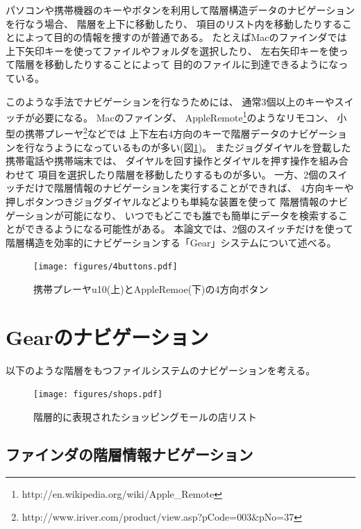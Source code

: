 \documentclass[twoside]{wiss}
\def\GEAR{\textsf{Gear}}
\begin{document}
パソコンや携帯機器のキーやボタンを利用して階層構造データのナビゲーションを行なう場合、
階層を上下に移動したり、
項目のリスト内を移動したりすることによって目的の情報を捜すのが普通である。
たとえばMacのファインダでは
上下矢印キーを使ってファイルやフォルダを選択したり、
左右矢印キーを使って階層を移動したりすることによって
目的のファイルに到達できるようになっている。

このような手法でナビゲーションを行なうためには、
通常3個以上のキーやスイッチが必要になる。
%
Macのファインダ、
AppleRemote\footnote{
  \textsf{http://en.wikipedia.org/wiki/Apple\_Remote}
}のようなリモコン、
小型の携帯プレーヤ\footnote{
  \textsf{http://www.iriver.com/product/view.asp?pCode=003\&pNo=37}
}などでは
上下左右4方向のキーで階層データのナビゲーションを行なうようになっているものが多い(図\ref{4buttons})。
またジョグダイヤルを登載した携帯電話や携帯端末では、
ダイヤルを回す操作とダイヤルを押す操作を組み合わせて
項目を選択したり階層を移動したりするものが多い。
%
一方、2個のスイッチだけで階層情報のナビゲーションを実行することができれば、
4方向キーや押しボタンつきジョグダイヤルなどよりも単純な装置を使って
階層情報のナビゲーションが可能になり、
いつでもどこでも誰でも簡単にデータを検索することができるようになる可能性がある。
%
本論文では、2個のスイッチだけを使って
階層構造を効率的にナビゲーションする「{\GEAR}」システムについて述べる。

\begin{figure}[H]
\centerline{\texttt{[image: figures/4buttons.pdf]}}
\caption{携帯プレーヤu10(上)とAppleRemoe(下)の4方向ボタン}
\label{4buttons}
\end{figure}

\section{{\GEAR}のナビゲーション}
\label{description}

以下のような階層をもつファイルシステムのナビゲーションを考える。

\begin{figure}[H]
\centerline{\texttt{[image: figures/shops.pdf]}}
\caption{階層的に表現されたショッピングモールの店リスト}
\label{screenshot1}
\end{figure}

\subsection{ファインダの階層情報ナビゲーション}
\end{document}
